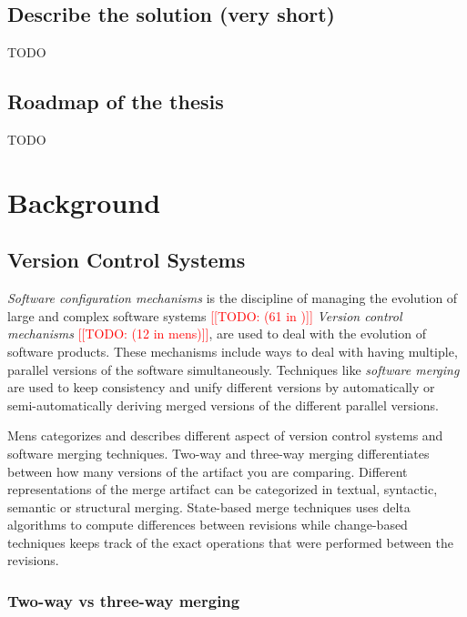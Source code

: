 \documentclass[a4paper,english]{ifimaster}
\newcommand{\todo}[1]{\textcolor{red}{[[TODO: #1]]}\PackageWarning{TODO:}{#1!}}
\begin{document}
\section{Describe the solution (very short)}%
\label{sec:describe_the_solution_very_short_}

TODO

\section{Roadmap of the thesis}%
\label{sec:roadmap_of_the_thesis}

TODO

\chapter{Background}%
\label{cha:introduction}

\section{Version Control Systems}%
\label{sec:version_control_systems}

\textit{Software configuration mechanisms} is the discipline of managing the evolution of large and complex software systems \todo{(61 in \cite{cite:tom_mens_software_merging_survey})} \textit{Version control mechanisms} \todo{(12 in mens)}, are used to deal with the evolution of software products. These mechanisms include ways to deal with having multiple, parallel versions of the software simultaneously. Techniques like \textit{software merging} are used to keep consistency and unify different versions by automatically or semi-automatically deriving merged versions of the different parallel versions.

Mens \cite{cite:tom_mens_software_merging_survey} categorizes and describes different aspect of version control systems and software merging techniques. Two-way and three-way merging differentiates between how many versions of the artifact you are comparing. Different representations of the merge artifact can be categorized in textual, syntactic, semantic or structural merging. State-based merge techniques uses delta algorithms to compute differences between revisions while change-based techniques keeps track of the exact operations that were performed between the revisions.

\subsection{Two-way vs three-way merging}%
\label{sub:two_way_vs_three_way_merging}
\end{document}
